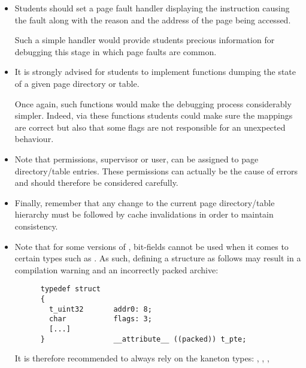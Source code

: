 \begin{itemize}
  \item
    Students should set a page fault handler displaying the instruction causing
    the fault along with the reason and the address of the page being accessed.

    \-

    Such a simple handler would provide students precious information for
    debugging this stage in which page faults are common.
  \item
    It is strongly advised for students to implement functions dumping the
    state of a given page directory or table.

    \-

    Once again, such functions would make the debugging process considerably
    simpler. Indeed, via these functions students could make sure the mappings
    are correct but also that some flags are not responsible for an
    unexpected behaviour.
  \item
    Note that permissions, supervisor or user, can be assigned to page
    directory/table entries. These permissions can actually be the cause
    of errors and should therefore be considered carefully.
  \item
    Finally, remember that any change to the current page directory/table
    hierarchy must be followed by cache invalidations in order to maintain
    consistency.
  \item
    Note that for some versions of , bit-fields cannot be used
    when it comes to certain types such as . As such, defining
    a structure as follows may result in a compilation warning and an
    incorrectly packed archive:

    \-

    \begin{verbatim}
      typedef struct
      {
        t_uint32       addr0: 8;
        char           flags: 3;
        [...]
      }                __attribute__ ((packed)) t_pte;
    \end{verbatim}

    \-

    It is therefore recommended to always rely on the kaneton types:
    , , , 
    \etc{}
\end{itemize}
